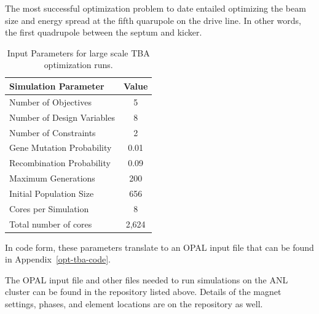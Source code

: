 \label{setup}
The most successful optimization problem to date entailed optimizing the 
beam size and energy spread at the fifth quarupole on the drive line.
In other words, the first quadrupole between the septum and kicker.
\begin{table}%
	\begin{center}
		\caption{Input Parameters for large scale TBA optimization runs.}
		\label{tab:opt-tba}
		\begin{tabular}{lc}
			\toprule
			\toprule
			\textbf{Simulation Parameter} 	&  \textbf{Value} \\ 
			\midrule
			{Number of Objectives}			&  5 \\
			Number of Design Variables		&  8 \\
			Number of Constraints			&  2 \\
			{Gene Mutation Probability} 	&  0.01\\ 
			{Recombination Probability} 	&  0.09 \\
			{Maximum  Generations}			&  200 \\
			{Initial  Population Size}		&  656\\ 
			Cores per Simulation 			&  8 \\
			Total number of cores			& 2,624  \\
			\bottomrule
		\end{tabular}
	\end{center}
\end{table}
In code form, these parameters translate to an OPAL input file that 
can be found in Appendix~\ref{opt-tba-code}.


The OPAL input file and other files needed to run simulations on the ANL cluster 
can be found in the repository listed above.
Details of the magnet settings, phases, and element locations are on the repository as well.


